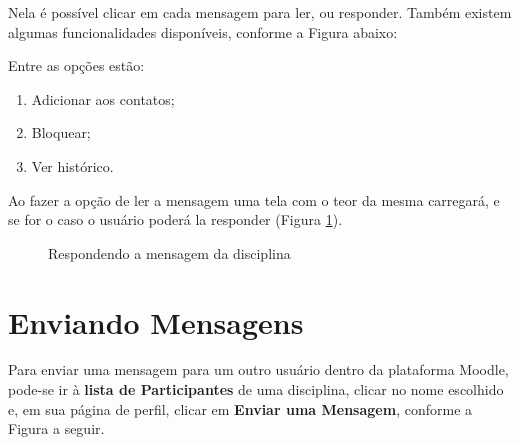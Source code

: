 Nela é possível clicar em cada mensagem para ler, ou responder. Também existem algumas funcionalidades disponíveis, conforme a Figura abaixo:


 \begin{center}
 \end{center}


Entre as opções estão:

\begin{enumerate}
\item Adicionar aos contatos;
\item Bloquear;
\item Ver histórico.
\end{enumerate}

Ao fazer a opção de ler a mensagem uma tela com o teor da mesma carregará, e se for o caso o usuário poderá la responder (Figura \ref{fig:cap2_17}).

\begin{figure}[!htbp]
 \begin{center}
  \caption{Respondendo a mensagem da disciplina}
  \label{fig:cap2_17}
 \end{center}
\end{figure}

\section{Enviando Mensagens}
Para enviar uma mensagem para um outro usuário dentro da plataforma Moodle, pode-se ir à \textbf{lista de Participantes} de uma disciplina, clicar no nome escolhido e, em sua página de perfil, clicar em \textbf{Enviar uma Mensagem}, conforme a Figura a seguir.


 \begin{center}
 \end{center}

